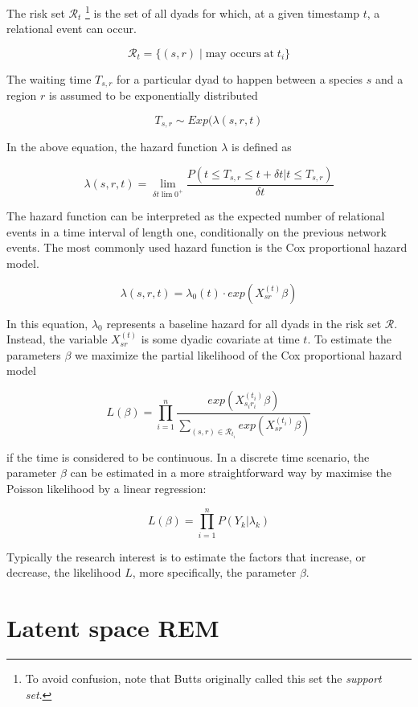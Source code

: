 \documentclass[mscthesis]{usiinfthesis}
\begin{document}
The risk set $\mathcal{R}_t$ \footnote{To avoid confusion, note that Butts originally called this set the \textit{support set}.} is the set of all dyads for which, at a given timestamp $t$, a relational event can occur.

\[
\mathcal{R}_{t} = \{(s,r) \; | \; \textrm{may occurs} \; \textrm{at} \; t_i\}
\]

The waiting time $T_{s,r}$ for a particular dyad to happen between a species $s$ and a region $r$ is assumed to be exponentially distributed 

\[
T_{s,r} \sim Exp(\lambda(s, r, t)
\]


In the above equation, the hazard function $\lambda$ is defined as

\[
\lambda(s, r, t) = \lim_{\delta t \lim 0^+} \frac{P(t \leq T_{s,r} \leq t + \delta t | t \leq T_{s,r})}{\delta t}
\]

The hazard function can be interpreted as the expected number of relational events in a time interval of length one, conditionally on the previous network events. The most commonly used hazard function is the Cox proportional hazard model. 


\[
\lambda(s, r, t) = \lambda_0(t) \cdot exp({X_{sr}^{(t)} \beta} )
\]

In this equation, $\lambda_0$ represents a baseline hazard for all dyads in the risk set $\mathcal{R}$. Instead, the variable $X_{sr}^{(t)}$ is some dyadic covariate at time $t$. To estimate the parameters $\beta$ we maximize the partial likelihood of the Cox proportional hazard model 


\[
L(\beta) =  \prod_{i=1}^n \frac{exp (X_{s_i r_i}^{(t_i)} \beta) }{ \sum_{(s,r) \in \mathcal{R}_{t_i}} exp({X_{sr}^{(t_i)} \beta} )}
\]

if the time is considered to be continuous. In a discrete time scenario, the parameter $\beta$ can be estimated in a more straightforward way by maximise the Poisson likelihood by a linear regression:

\[
L(\beta) =  \prod_{i=1}^n P(Y_k | \lambda_k)
\]


Typically the research interest is to estimate the factors that increase, or decrease, the likelihood $L$, more specifically, the parameter $\beta$.



\section{Latent space REM}
 
\end{document}
